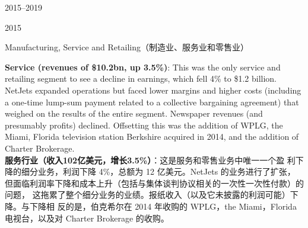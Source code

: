 \begin{chapter}{2015--2019}
\begin{section}{2015}
\begin{subsection}{Manufacturing, Service and Retailing（制造业、服务业和零售业）}
\begin{verseparallel}
  {
    \textbf{Service (revenues of \$10.2bn, up 3.5\%)}: This was the only service
    and retailing segment to see a decline in earnings, which fell 4\% to \$1.2
    billion. NetJets expanded operations but faced lower margins and higher
    costs (including a one-time lump-sum payment related to a collective
    bargaining agreement) that weighed on the results of the entire segment.
    Newspaper revenues (and presumably profits) declined. Offsetting this was
    the addition of WPLG, the Miami, Florida television station Berkshire
    acquired in 2014, and the addition of Charter Brokerage. \\
  }
  {
    \textbf{服务行业（收入102亿美元，增长3.5\%）}：这是服务和零售业务中唯一一个盈
    利下降的细分业务，利润下降 4\%，总额为 12 亿美元。NetJets 的业务进行了扩张，
    但面临利润率下降和成本上升（包括与集体谈判协议相关的一次性一次性付款）的问题，
    这拖累了整个细分业务的业绩。报纸收入（以及它未披露的利润可能）下降。与下降相
    反的是，伯克希尔在 2014 年收购的 WPLG，the Miami，Florida 电视台，以及对
    Charter Brokerage 的收购。
  }
\end{verseparallel}


\end{subsection}
\end{section}
\end{chapter}
